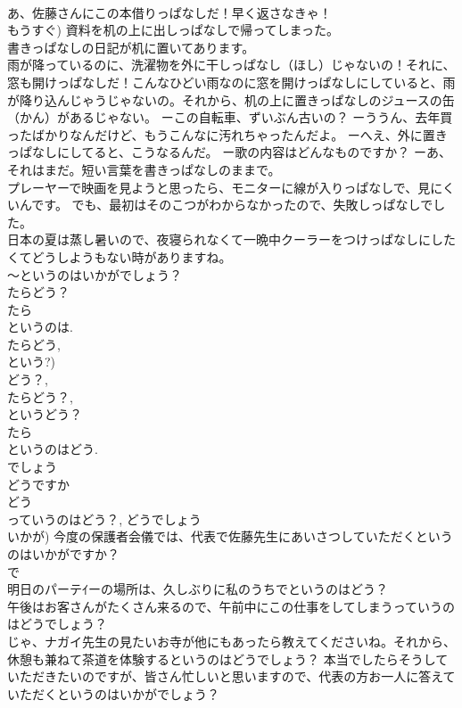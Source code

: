 \documentclass[8pt]{extreport}
\begin{document}
\begin{CJK}{UTF8}{min}
\\	あ、佐藤さんにこの本借りっぱなしだ！早く返さなきゃ！ 
\\	もうすぐ) 資料を机の上に出しっぱなしで帰ってしまった。 
\\	書きっぱなしの日記が机に置いてあります。 
\\	雨が降っているのに、洗濯物を外に干しっぱなし（ほし）じゃないの！それに、窓も開けっぱなしだ！こんなひどい雨なのに窓を開けっぱなしにしていると、雨が降り込んじゃうじゃないの。それから、机の上に置きっぱなしのジュースの缶（かん）があるじゃない。 ーこの自転車、ずいぶん古いの？ ーううん、去年買ったばかりなんだけど、もうこんなに汚れちゃったんだよ。 ーへえ、外に置きっぱなしにしてると、こうなるんだ。 ー歌の内容はどんなものですか？ ーあ、それはまだ。短い言葉を書きっぱなしのままで。 
\\	プレーヤーで映画を見ようと思ったら、モニターに線が入りっぱなしで、見にくいんです。 でも、最初はそのこつがわからなかったので、失敗しっぱなしでした。 
\\	日本の夏は蒸し暑いので、夜寝られなくて一晩中クーラーをつけっぱなしにしたくてどうしようもない時がありますね。 
\\	～というのはいかがでしょう？	
\\	たらどう？ 
\\	たら 
\\	というのは. 
\\	たらどう, 
\\	という?) 
\\	どう？, 
\\	たらどう？, 
\\	というどう？ 
\\	たら 
\\	というのはどう. 
\\	でしょう 
\\	どうですか 
\\	どう 
\\	っていうのはどう？, どうでしょう 
\\	いかが) 今度の保護者会儀では、代表で佐藤先生にあいさつしていただくというのはいかがですか？ 
\\	で 
\\	明日のパーテｲーの場所は、久しぶりに私のうちでというのはどう？ 
\\	午後はお客さんがたくさん来るので、午前中にこの仕事をしてしまうっていうのはどうでしょう？ 
\\	じゃ、ナガイ先生の見たいお寺が他にもあったら教えてくださいね。それから、休憩も兼ねて茶道を体験するというのはどうでしょう？ 本当でしたらそうしていただきたいのですが、皆さん忙しいと思いますので、代表の方お一人に答えていただくというのはいかがでしょう？

\end{CJK}
\end{document}
